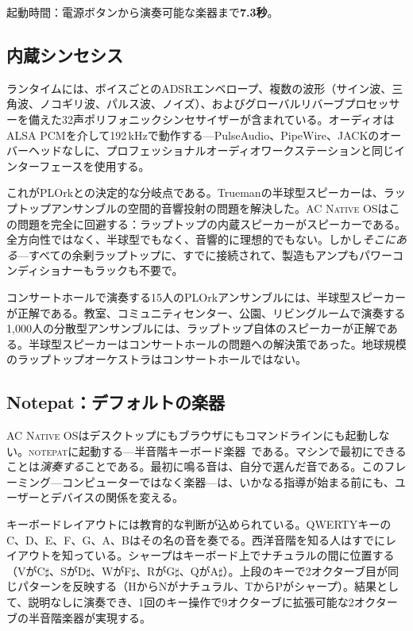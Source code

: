 \documentclass[10pt,letterpaper,twocolumn]{article}
\newcommand{\acos}{\textsc{AC Native OS}}
\newcommand{\np}{\textsc{notepat}}
\begin{document}
起動時間：電源ボタンから演奏可能な楽器まで\textbf{7.3秒}。

\subsection{内蔵シンセシス}

ランタイムには、ボイスごとのADSRエンベロープ、複数の波形（サイン波、三角波、ノコギリ波、パルス波、ノイズ）、およびグローバルリバーブプロセッサーを備えた32声ポリフォニックシンセサイザーが含まれている。オーディオはALSA PCMを介して192\,kHzで動作する---PulseAudio、PipeWire、JACKのオーバーヘッドなしに、プロフェッショナルオーディオワークステーションと同じインターフェースを使用する。

これがPLOrkとの決定的な分岐点である。Truemanの半球型スピーカーは、ラップトップアンサンブルの空間的音響投射の問題を解決した。\acos{}はこの問題を完全に回避する：ラップトップの内蔵スピーカーがスピーカーである。全方向性ではなく、半球型でもなく、音響的に理想的でもない。しかし\emph{そこにある}---すべての余剰ラップトップに、すでに接続されて、製造もアンプもパワーコンディショナーもラックも不要で。

コンサートホールで演奏する15人のPLOrkアンサンブルには、半球型スピーカーが正解である。教室、コミュニティセンター、公園、リビングルームで演奏する1,000人の分散型アンサンブルには、ラップトップ自体のスピーカーが正解である。半球型スピーカーはコンサートホールの問題への解決策であった。地球規模のラップトップオーケストラはコンサートホールではない。

\subsection{Notepat：デフォルトの楽器}
\label{sec:notepat}

\acos{}はデスクトップにもブラウザにもコマンドラインにも起動しない。\np{}に起動する---半音階キーボード楽器~\citep{scudder2026notepat}である。マシンで最初にできることは\emph{演奏する}ことである。最初に鳴る音は、自分で選んだ音である。このフレーミング---コンピューターではなく楽器---は、いかなる指導が始まる前にも、ユーザーとデバイスの関係を変える。

キーボードレイアウトには教育的な判断が込められている。QWERTYキーのC、D、E、F、G、A、Bはその名の音を奏でる。西洋音階を知る人はすでにレイアウトを知っている。シャープはキーボード上でナチュラルの間に位置する（VがC\(\sharp\)、SがD\(\sharp\)、WがF\(\sharp\)、RがG\(\sharp\)、QがA\(\sharp\)）。上段のキーで2オクターブ目が同じパターンを反映する（HからNがナチュラル、TからPがシャープ）。結果として、説明なしに演奏でき、1回のキー操作で9オクターブに拡張可能な2オクターブの半音階楽器が実現する。
\end{document}
